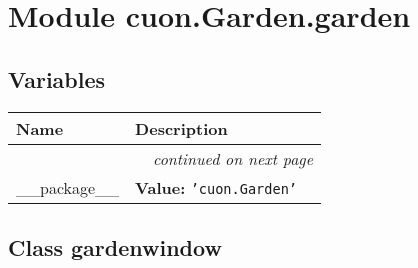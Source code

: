 %
%
%


\section{Module cuon.Garden.garden}

    \label{cuon:Garden:garden}


  \subsection{Variables}

    \vspace{-1cm}
\hspace{\varindent}\begin{longtable}{|p{\varnamewidth}|p{\vardescrwidth}|l}
\cline{1-2}
\cline{1-2} \centering \textbf{Name} & \centering \textbf{Description}& \\
\cline{1-2}
\endhead\cline{1-2}\multicolumn{3}{r}{\small\textit{continued on next page}}\\\endfoot\cline{1-2}
\endlastfoot\raggedright \_\-\_\-p\-a\-c\-k\-a\-g\-e\-\_\-\_\- & \raggedright \textbf{Value:} 
{\tt \texttt{'}\texttt{cuon.Garden}\texttt{'}}&\\
\cline{1-2}
\end{longtable}



\subsection{Class gardenwindow}

